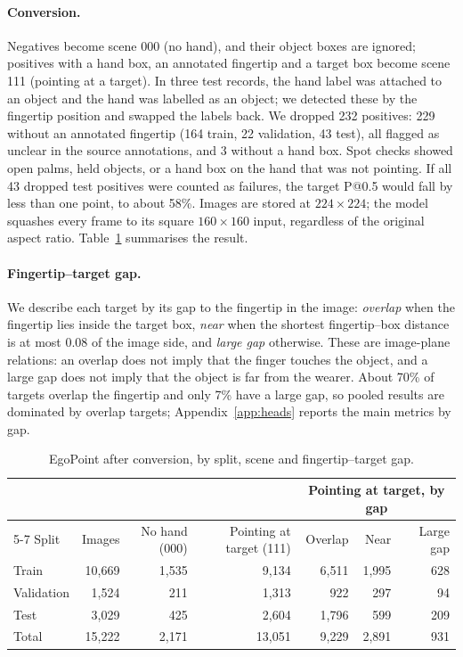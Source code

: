 \paragraph{Conversion.} Negatives become scene 000 (no hand), and their object boxes are ignored; positives with a hand box, an annotated fingertip and a target box become scene 111 (pointing at a target). In three test records, the hand label was attached to an object and the hand was labelled as an object; we detected these by the fingertip position and swapped the labels back. We dropped 232 positives: 229 without an annotated fingertip (164 train, 22 validation, 43 test), all flagged as unclear in the source annotations, and 3 without a hand box. Spot checks showed open palms, held objects, or a hand box on the hand that was not pointing. If all 43 dropped test positives were counted as failures, the target P@0.5 would fall by less than one point, to about 58\%. Images are stored at $224\times224$; the model squashes every frame to its square $160\times160$ input, regardless of the original aspect ratio. Table~\ref{tab:data} summarises the result.

\paragraph{Fingertip--target gap.} We describe each target by its gap to the fingertip in the image: \emph{overlap} when the fingertip lies inside the target box, \emph{near} when the shortest fingertip--box distance is at most 0.08 of the image side, and \emph{large gap} otherwise. These are image-plane relations: an overlap does not imply that the finger touches the object, and a large gap does not imply that the object is far from the wearer. About 70\% of targets overlap the fingertip and only 7\% have a large gap, so pooled results are dominated by overlap targets; Appendix~\ref{app:heads} reports the main metrics by gap.

\begin{table}[h]
  \caption{EgoPoint after conversion, by split, scene and fingertip--target gap.}
  \label{tab:data}
  \footnotesize
  \begin{tabular}{lrrrrrr}
    \toprule
    & & & & \multicolumn{3}{c}{Pointing at target, by gap} \\
    \cmidrule(l){5-7}
    Split & Images & No hand (000) & Pointing at target (111) & Overlap & Near & Large gap \\
    \midrule
    Train & 10,669 & 1,535 & 9,134 & 6,511 & 1,995 & 628 \\
    Validation & 1,524 & 211 & 1,313 & 922 & 297 & 94 \\
    Test & 3,029 & 425 & 2,604 & 1,796 & 599 & 209 \\
    \midrule
    Total & 15,222 & 2,171 & 13,051 & 9,229 & 2,891 & 931 \\
    \bottomrule
  \end{tabular}
\end{table}

